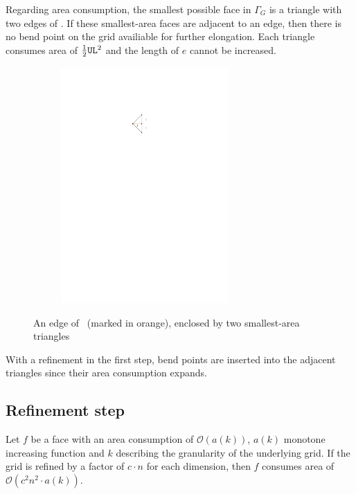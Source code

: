 \bigskip
Regarding area consumption, the smallest possible face in $\Gamma_G$ is a triangle with two edges of \UL. If these smallest-area faces are adjacent to an edge, then there is no bend point on the grid availiable for further elongation. Each triangle consumes area of $\frac{1}{2}\texttt{UL}^2$ and the length of $e$ cannot be increased.
\begin{figure}[H]
	\centering
	\begin{subfigure}{0.3\linewidth}
		\centering
		\includegraphics[width=0.7\textwidth,page=1]{drawings/maximal_planar.pdf}
	\end{subfigure}
\caption{An edge of \UL~(marked in orange), enclosed by two smallest-area triangles}\label{im:area_worst_case_straight-line}
\end{figure}
With a refinement in the first step, bend points are inserted into the adjacent triangles since their area consumption expands.



\subsection{Refinement step}
\begin{fact}\label{fact:area-expansion}
\end{fact}
Let $f$ be a face with an area consumption of $\mathcal{O}(a(k))$, $a(k)$ monotone increasing function and $k$ describing the granularity of the underlying grid. If the grid is refined by a factor of $c\cdot n$ for each dimension, then $f$ consumes area of $\mathcal{O}(c^2n^2 \cdot a(k))$.


